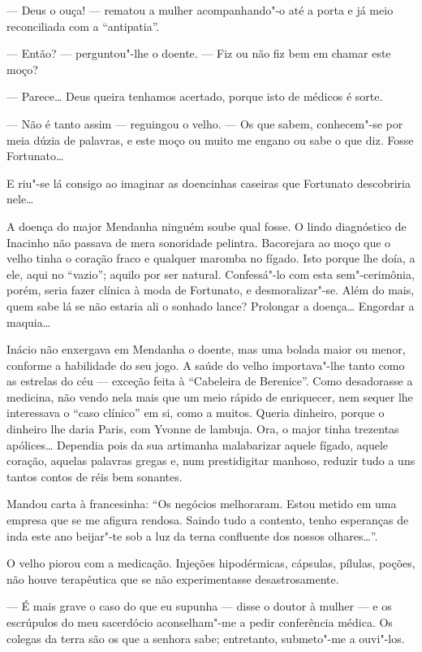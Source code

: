 --- Deus o ouça! --- rematou a mulher acompanhando"-o até a porta e já
meio reconciliada com a ``antipatia''.

--- Então? --- perguntou"-lhe o doente. --- Fiz ou não fiz bem em chamar
este moço?

--- Parece\ldots{} Deus queira tenhamos acertado, porque isto de médicos é
sorte.

--- Não é tanto assim --- reguingou o velho. --- Os que sabem,
conhecem"-se por meia dúzia de palavras, e este moço ou muito me engano
ou sabe o que diz. Fosse Fortunato\ldots{}

E riu"-se lá consigo ao imaginar as doencinhas caseiras que Fortunato
descobriria nele\ldots{}

A doença do major Mendanha ninguém soube qual fosse. O lindo diagnóstico
de Inacinho não passava de mera sonoridade pelintra. Bacorejara ao moço
que o velho tinha o coração fraco e qualquer maromba no fígado. Isto
porque lhe doía, a ele, aqui no ``vazio''; aquilo por ser natural.
Confessá"-lo com esta sem"-cerimônia, porém, seria fazer clínica à moda de
Fortunato, e desmoralizar"-se. Além do mais, quem sabe lá se não estaria
ali o sonhado lance? Prolongar a doença\ldots{} Engordar a maquia\ldots{}

Inácio não enxergava em Mendanha o doente, mas uma bolada maior ou
menor, conforme a habilidade do seu jogo. A saúde do velho importava"-lhe
tanto como as estrelas do céu --- exceção feita à ``Cabeleira de
Berenice''. Como desadorasse a medicina, não vendo nela mais que um meio
rápido de enriquecer, nem sequer lhe interessava o ``caso clínico'' em
si, como a muitos. Queria dinheiro, porque o dinheiro lhe daria Paris,
com Yvonne de lambuja. Ora, o major tinha trezentas apólices\ldots{} Dependia
pois da sua artimanha malabarizar aquele fígado, aquele coração, aquelas
palavras gregas e, num prestidigitar manhoso, reduzir tudo a uns tantos
contos de réis bem sonantes.

Mandou carta à francesinha: ``Os negócios melhoraram. Estou metido em
uma empresa que se me afigura rendosa. Saindo tudo a contento, tenho
esperanças de inda este ano beijar"-te sob a luz da terna confluente dos
nossos olhares\ldots{}''.

O velho piorou com a medicação. Injeções hipodérmicas, cápsulas,
pílulas, poções, não houve terapêutica que se não experimentasse
desastrosamente.

--- É mais grave o caso do que eu supunha --- disse o doutor à mulher
--- e os escrúpulos do meu sacerdócio aconselham"-me a pedir conferência
médica. Os colegas da terra são os que a senhora sabe; entretanto,
submeto"-me a ouvi"-los.

